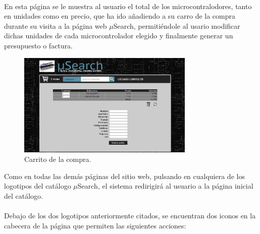 \paragraph{}En esta página se le muestra al usuario el total de los microcontralodores, tanto en unidades como en precio, que ha ido añadiendo a su carro de la compra durante su visita a la página web $\mu$Search, permitiéndole al usario modificar dichas unidades de cada microcontrolador elegido y finalmente generar un presupuesto o factura.

\begin{figure}[h!]
	\centering
	\includegraphics[width=0.75\textwidth]{img/carrito}
	\caption{Carrito de la compra.}
	\label{fig:carrito}
\end{figure}

Como en todas las demás páginas del sitio web, pulsando en cualquiera de los logotipos del catálogo $\mu$Search, el sistema redirigirá al usuario a la página inicial del catálogo.

\paragraph{}Debajo de los dos logotipos anteriormente citados, se encuentran dos iconos en la cabecera de la página que permiten las siguientes acciones:

